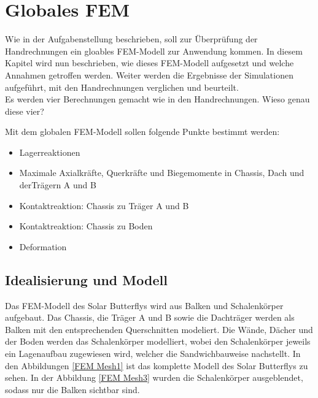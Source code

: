 \section{Globales FEM}
Wie in der Aufgabenstellung beschrieben, soll zur Überprüfung der Handrechnungen ein gloables FEM-Modell zur Anwendung kommen. In diesem Kapitel wird nun beschrieben, wie dieses FEM-Modell aufgesetzt und welche Annahmen getroffen werden. Weiter werden die Ergebnisse der Simulationen aufgeführt, mit den Handrechnungen verglichen und beurteilt.\\

Es werden vier Berechnungen gemacht wie in den Handrechnungen. Wieso genau diese vier?

Mit dem globalen FEM-Modell sollen folgende Punkte bestimmt werden:
\begin{itemize}
  \item Lagerreaktionen
  \item Maximale Axialkräfte, Querkräfte und Biegemomente in Chassis, Dach und derTrägern A und B
  \item Kontaktreaktion: Chassis zu Träger A und B
  \item Kontaktreaktion: Chassis zu Boden
  \item Deformation
\end{itemize}

\subsection{Idealisierung und Modell}
Das FEM-Modell des Solar Butterflys wird aus Balken und Schalenkörper aufgebaut. Das Chassis, die Träger A und B sowie die Dachträger werden als Balken mit den entsprechenden Querschnitten modeliert. Die Wände, Dächer und der Boden werden das Schalenkörper modelliert, wobei den Schalenkörper jeweils ein Lagenaufbau zugewiesen wird, welcher die Sandwichbauweise nachstellt. In den Abbildungen \ref{FEM Mesh1} ist das komplette Modell des Solar Butterflys zu sehen. In der Abbildung \ref{FEM Mesh3} wurden die Schalenkörper ausgeblendet, sodass nur die Balken sichtbar sind.

